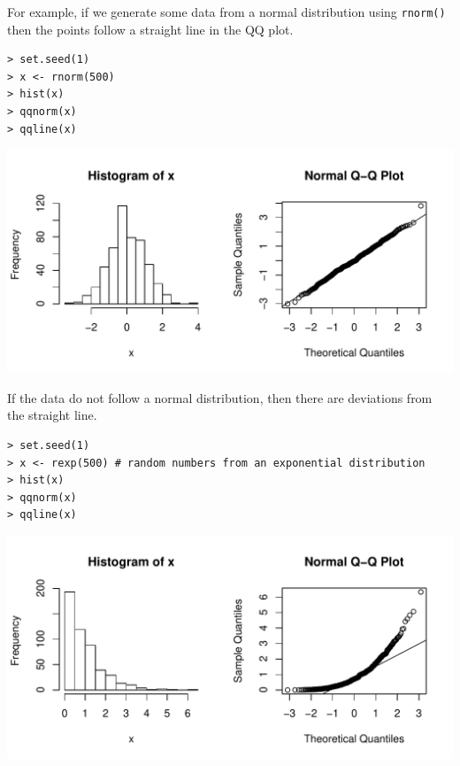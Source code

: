 \documentclass[10pt]{beamer}
\begin{document}
\begin{frame}[fragile]
For example, if we generate some data from a normal distribution using \texttt{rnorm()} then the points follow a straight line in the QQ plot.
\small
\begin{verbatim}
> set.seed(1)
> x <- rnorm(500)
> hist(x)
> qqnorm(x)
> qqline(x)
\end{verbatim}
\begin{center}
\includegraphics[scale=0.55]{figure/qqnorm1.pdf}
\end{center}
\end{frame}

\begin{frame}[fragile]
If the data do not follow a normal distribution, then there are deviations from the straight line.
\small
\begin{verbatim}
> set.seed(1)
> x <- rexp(500) # random numbers from an exponential distribution
> hist(x)
> qqnorm(x)
> qqline(x)
\end{verbatim}
\begin{center}
\includegraphics[scale=0.55]{figure/qqexp1.pdf}
\end{center}
\end{frame}
\end{document}
